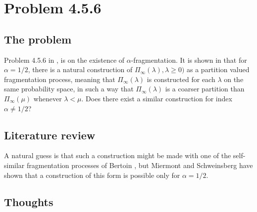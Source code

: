 \section{Problem 4.5.6} 

\subsection{The problem}%

Problem 4.5.6 in \cite[page 96]{MR2245368}, is on the existence of $\alpha$-fragmentation. 
It is shown in \cite[Chapter 9]{MR2245368} that for $\alpha = 1/2$, there is a natural construction of $\Pi_\infty(\lambda), \lambda \geq 0)$ as a partition valued fragmentation process, meaning that $\Pi_\infty(\lambda)$ is constructed for each $\lambda$ on the same probability space, in such a way that $\Pi_\infty(\lambda)$ is a coarser partition than $\Pi_\infty(\mu)$ whenever $\lambda < \mu$. Does there exist a similar construction for index $\alpha \neq 1/2$? 

\subsection{Literature review} %

A natural guess is that
such a construction might be made with one of the self-similar fragmentation
processes of Bertoin \cite{MR1899456}, but Miermont and Schweinsberg \cite{MR2053052} have shown that
a construction of this form is possible only for $\alpha = 1/2$. 

\subsection{Thoughts} %
